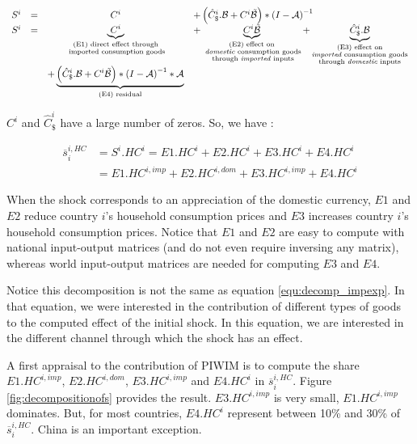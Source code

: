 \documentclass[11pt,a4paper]{article}
\begin{document}
\begin{equation}
\begin{array}{lccl}
	S^ i&=&C^i	&+ \left(\hat{C}^i_\$.{\cal B}+{C^i}{\tilde{{\cal B}}}\right)*{{(I-{\cal A})}^{-1}} \\
	S^i &=&\underbrace{C^i}_{\substack{\text{(E1) direct effect through} \\ \text{ imported consumption goods}}}&+ \underbrace{{C^i}{\tilde{{\cal B}}}}_{\substack{\text{(E2) effect on} \\ \text{ \emph{domestic} consumption goods} \\ \text{ through \emph{imported} inputs}}}  + \underbrace{\hat{C}^i_\$.{\cal B}}_{\substack{\text{(E3)  effect on} \\ \text{\emph{imported} consumption goods} \\ \text{through \emph{domestic} inputs}}} \\ &&+\underbrace {\left( \hat{C}^i_\$.{\cal B} + {C^i}{\tilde{{\cal B}}}\right)*{{(I-{\cal A})}^{-1}}*{\cal A}}_{\text{(E4) residual}} \\
\end{array}
\end{equation}


$C^i$ and $\hat{C}^i_\$$ have a large number of zeros. So, we have :

\begin{equation}
\begin{array}{lccl}
\overline{s}_{i}^{i,HC}&=S^i.HC^i=E1.HC^i+E2.HC^i+E3.HC^i+E4.HC^i \\
&=E1.HC^{i,imp}+E2.HC^{i,dom}+E3.HC^{i,imp}+E4.HC^i
 \end{array} 
 \end{equation}
 
When the shock corresponds to an appreciation of the domestic currency, $E1$ and $E2$ reduce country $i$'s household consumption prices and $E3$ increases country $i$'s household consumption prices. Notice that $E1$ and $E2$ are easy to compute with national input-output matrices (and do not even require inversing any matrix), whereas world input-output matrices are needed for computing $E3$ and $E4$.
 
Notice this decomposition is not the same as equation \ref{equ:decomp_impexp}. In that equation, we were interested in the contribution of different types of goods to the computed effect of the initial shock. In this equation, we are interested in the different channel through which the shock has an effect.


A first appraisal to the contribution of PIWIM is to compute the share $E1.HC^{i,imp}$, $E2.HC^{i,dom}$, $E3.HC^{i,imp}$ and $E4.HC^i$ in $\overline{s}_{i}^{i,HC}$. Figure \ref{fig:decompositionofs} provides the result. $E3.HC^{i,imp}$ is very small, $E1.HC^{i,imp}$ dominates. But, for most countries, $E4.HC^i$ represent between 10\% and 30\% of $\overline{s}_{i}^{i,HC}$.
China is an important exception.
\end{document}
